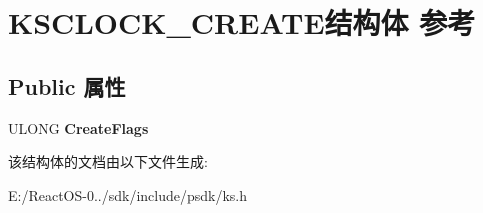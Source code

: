 \hypertarget{struct_k_s_c_l_o_c_k___c_r_e_a_t_e}{}\section{K\+S\+C\+L\+O\+C\+K\+\_\+\+C\+R\+E\+A\+T\+E结构体 参考}
\label{struct_k_s_c_l_o_c_k___c_r_e_a_t_e}
\subsection*{Public 属性}
\begin{DoxyCompactItemize}
\item 
\mbox{\label{struct_k_s_c_l_o_c_k___c_r_e_a_t_e_a9538a723bd1b9e751525f8368120063e}} 
U\+L\+O\+NG {\bfseries Create\+Flags}
\end{DoxyCompactItemize}


该结构体的文档由以下文件生成\+:\begin{DoxyCompactItemize}
\item 
E\+:/\+React\+O\+S-\/0../sdk/include/psdk/ks.\+h\end{DoxyCompactItemize}

